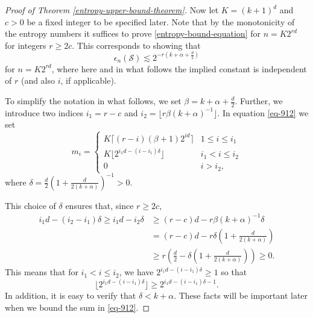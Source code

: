 \begin{proof}[Proof of Theorem \ref{entropy-upper-bound-theorem}]
Now let $K = (k+1)^d$ and $c > 0$ be a fixed integer to be specified later. Note that by the monotonicity of the entropy numbers it suffices to prove \eqref{entropy-bound-equation} for $n = K2^{rd}$ for integers $r \geq 2c$. This corresponds to showing that
\begin{equation}
 \epsilon_n(\mathcal{S}) \lesssim 2^{-r\left(k+\alpha+\frac{d}{2}\right)}
\end{equation}
for $n = K2^{rd}$, where here and in what follows the implied constant is independent of $r$ (and also $i$, if applicable).

To simplify the notation in what follows, we set $\beta = k+\alpha+\frac{d}{2}$. Further, we introduce two indices $i_1 = r-c$ and $i_2 = \lfloor r\beta(k+\alpha)^{-1}\rfloor$. In equation \eqref{eq-912} we set
\begin{equation}
 m_i = \begin{cases} 
         K\lceil(r-i)(\beta + 1)2^{id}\rceil & 1\leq i\leq i_1 \\
         K\lfloor2^{i_1d - (i - i_1)\delta}\rfloor & i_1 < i\leq i_2 \\
         0 & i > i_2,
       \end{cases}
\end{equation}
where $\delta = \frac{d}{2}\left(1 + \frac{d}{2(k+\alpha)}\right)^{-1} > 0$.

This choice of $\delta$ ensures that, since $r \geq 2c$,
\begin{equation}
\begin{split}
i_1d - (i_2 - i_1)\delta \geq i_1d - i_2\delta &\geq (r-c)d - r\beta(k+\alpha)^{-1}\delta \\
& = (r - c)d - r\delta\left(1 + \frac{d}{2(k+\alpha)}\right) \\
& \geq r\left(\frac{d}{2} - \delta\left(1 + \frac{d}{2(k+\alpha)}\right)\right) \geq 0.
\end{split}
\end{equation}
This means that for $i_1 < i\leq i_2$, we have $2^{i_1d - (i - i_1)\delta} \geq 1$ so that
\begin{equation}\label{delta-choice-bound}
 \lfloor2^{i_1d - (i - i_1)\delta}\rfloor \geq 2^{i_1d - (i - i_1)\delta - 1}.
\end{equation}
In addition, it is easy to verify that $\delta < k+\alpha$. These facts will be important later when we bound the sum in \eqref{eq-912}.


\end{proof}
